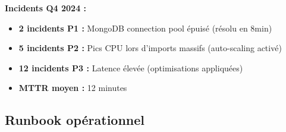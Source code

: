 \begin{tcolorbox}[colback=yellow!5!white,colframe=yellow!60!black,title=\textbf{Métriques de monitoring en production (Décembre 2024)}]
\textbf{Incidents Q4 2024 :}
\begin{itemize}
    \item \textbf{2 incidents P1 :} MongoDB connection pool épuisé (résolu en 8min)
    \item \textbf{5 incidents P2 :} Pics CPU lors d'imports massifs (auto-scaling activé)
    \item \textbf{12 incidents P3 :} Latence élevée (optimisations appliquées)
    \item \textbf{MTTR moyen :} 12 minutes
\end{itemize}
\end{tcolorbox}

\subsection{Runbook opérationnel}

